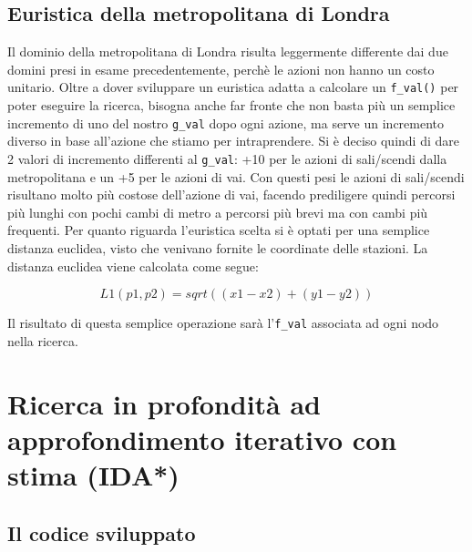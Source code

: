 \subsection{Euristica della metropolitana di Londra}
Il dominio della metropolitana di Londra risulta leggermente differente dai due domini presi in esame precedentemente, perchè le azioni non hanno un costo unitario. Oltre a dover sviluppare un euristica adatta a calcolare un \lstinline{f_val()} per poter eseguire la ricerca, bisogna anche far fronte che non basta più un semplice incremento di uno del nostro \lstinline{g_val} dopo ogni azione, ma serve un incremento diverso in base all'azione che stiamo per intraprendere. Si è deciso quindi di dare 2 valori di incremento differenti al \lstinline{g_val}: +10 per le azioni di sali/scendi dalla metropolitana e un +5 per le azioni di vai. Con questi pesi le azioni di sali/scendi risultano molto più costose dell'azione di vai, facendo prediligere quindi percorsi più lunghi con pochi cambi di metro a percorsi più brevi ma con cambi più frequenti.
Per quanto riguarda l'euristica scelta si è optati per una semplice distanza euclidea, visto che venivano fornite le coordinate delle stazioni. La distanza euclidea viene calcolata come segue:

$$L1(p1,p2) = sqrt((x1 - x2)+(y1 - y2))$$

Il risultato di questa semplice operazione sarà l'\lstinline{f_val} associata ad ogni nodo nella ricerca.

\section{Ricerca in profondità ad approfondimento iterativo con stima (IDA*)}

\subsection{Il codice sviluppato}

